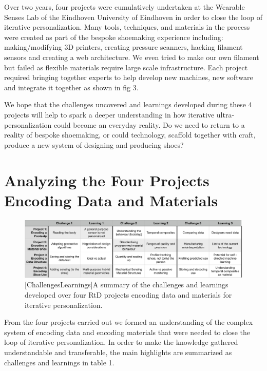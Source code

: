 Over two years, four projects were cumulatively undertaken at the Wearable Senses Lab of the Eindhoven University of Eindhoven in order to close the loop of iterative personalization. Many tools, techniques, and materials in the process were created as part of the bespoke shoemaking experience including: making/modifying 3D printers, creating pressure scanners, hacking filament sensors and creating a web architecture. We even tried to make our own filament but failed as flexible materials require large scale infrastructure. Each project required bringing together experts to help develop new machines, new software and integrate it together as shown in fig 3.

We hope that the challenges uncovered and learnings developed during these 4 projects will help to spark a deeper understanding in how iterative ultra-personalization could become an everyday reality. Do we need to return to a reality of bespoke shoemaking, or could technology, scaffold together with craft, produce a new system of designing and producing shoes?

\section{Analyzing the Four Projects Encoding Data and Materials}

\begin{figure}
\includegraphics[width=.999\textwidth]{Table}
[ChallengesLearnings]{A summary of the challenges and learnings developed over four RtD projects encoding data and materials for iterative personalization.}
\label{fig:ChallengesLearnings}
\end{figure}

From the four projects carried out we formed an understanding of the complex system of encoding data and encoding materials that were needed to close the loop of iterative personalization. In order to make the knowledge gathered understandable and transferable, the main highlights are summarized as challenges and learnings in table 1.

